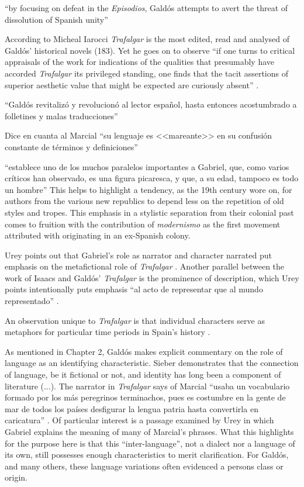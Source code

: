 \documentclass[12pt]{report}
\begin{document}
\enquote{by focusing on defeat in the \textit{Episodios}, Galdós attempts to avert the threat of dissolution of Spanish unity} \cite[12]{Kempen2007}

According to Micheal Iarocci \textit{Trafalgar} is the most edited, read and analysed of Galdós' historical novels (183)\nocite{Iarocci2003}.
Yet he goes on to observe \enquote{if one turns to critical appraisals of the work for indications of the qualities that presumably have accorded \textit{Trafalgar} its privileged standing, one finds that the tacit assertions of superior aesthetic value that might be expected are curiously absent} \cite[183]{Iarocci2003}.


\enquote{Galdós revitalizó y revolucionó al lector español, hasta entonces acostumbrado a folletines y malas traducciones} \cite[1525]{Urey1992}

Dice en cuanta al Marcial \enquote{su lenguaje es <<mareante>> en su confusión constante de términos y definiciones} \cite[1526]{Urey1992}

\enquote{establece uno de los muchos paralelos importantes a Gabriel, que, como varios críticos han observado, es una figura picaresca, y que, a su edad, tampoco es todo un hombre} \cite[1526]{Urey1992}
This helps to highlight a tendency, as the 19th century wore on, for authors from the various new republics to depend less on the repetition of old styles and tropes.
This emphasis in a stylistic separation from their colonial past comes to fruition with the contribution of \textit{modernismo} as the first movement attributed with originating in an ex-Spanish colony.

Urey points out that Gabriel's role as narrator and character narrated put emphasis on the metafictional role of \textit{Trafalgar} \cite[1526]{Urey1992}.
Another parallel between the work of Isaacs and Galdós' \textit{Trafalgar} is the prominence of description, which Urey points intentionally puts emphasis \enquote{al acto de representar que al mundo representado} \cite[1527]{Urey1992}.


An observation unique to \textit{Trafalgar} is that individual characters serve as metaphors for particular time periods in Spain's history \cite[1527]{Urey1992}. 


As mentioned in Chapter 2, Galdós makes explicit commentary on the role of language as an identifying characteristic.
Sieber demonstrates that the connection of language, be it fictional or not, and identity has long been a component of literature \nocite{Sieber1978}(...).
The narrator in \textit{Trafalgar} says of Marcial \enquote{usaba un vocabulario formado por los más peregrinos terminachos, pues es costumbre en la gente de mar de todos los países desfigurar la lengua patria hasta convertirla en caricatura} \cite[21]{Galdós1882}.
Of particular interest is a passage examined by Urey in which Gabriel explains the meaning of many of Marcial's phrases.
What this highlights for the purpose here is that this \enquote{inter-language}, not a dialect nor a language of its own, still possesses enough characteristics to merit clarification.
For Galdós, and many others, these language variations often evidenced a persons class or origin.
\end{document}
